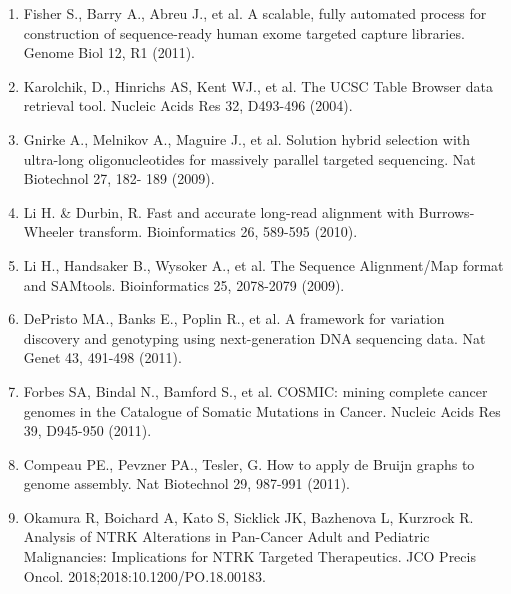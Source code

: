 \begin{enumerate}
\def\labelenumi{\arabic{enumi}.}
\tightlist
\item
  Fisher S., Barry A., Abreu J., et al. A scalable, fully automated
  process for construction of sequence-ready human exome targeted
  capture libraries. Genome Biol 12, R1 (2011).
\item
  Karolchik, D., Hinrichs AS, Kent WJ., et al. The UCSC Table Browser
  data retrieval tool. Nucleic Acids Res 32, D493-496 (2004).
\item
  Gnirke A., Melnikov A., Maguire J., et al. Solution hybrid selection
  with ultra-long oligonucleotides for massively parallel targeted
  sequencing. Nat Biotechnol 27, 182- 189 (2009).
\item
  Li H. \& Durbin, R. Fast and accurate long-read alignment with
  Burrows-Wheeler transform. Bioinformatics 26, 589-595 (2010).
\item
  Li H., Handsaker B., Wysoker A., et al. The Sequence Alignment/Map
  format and SAMtools. Bioinformatics 25, 2078-2079 (2009).
\item
  DePristo MA., Banks E., Poplin R., et al. A framework for variation
  discovery and genotyping using next-generation DNA sequencing data.
  Nat Genet 43, 491-498 (2011).
\item
  Forbes SA, Bindal N., Bamford S., et al. COSMIC: mining complete
  cancer genomes in the Catalogue of Somatic Mutations in Cancer.
  Nucleic Acids Res 39, D945-950 (2011).
\item
  Compeau PE., Pevzner PA., Tesler, G. How to apply de Bruijn graphs to
  genome assembly. Nat Biotechnol 29, 987-991 (2011).
\item
  Okamura R, Boichard A, Kato S, Sicklick JK, Bazhenova L, Kurzrock R.
  Analysis of NTRK Alterations in Pan-Cancer Adult and Pediatric
  Malignancies: Implications for NTRK Targeted Therapeutics. JCO Precis
  Oncol. 2018;2018:10.1200/PO.18.00183.
\end{enumerate}
